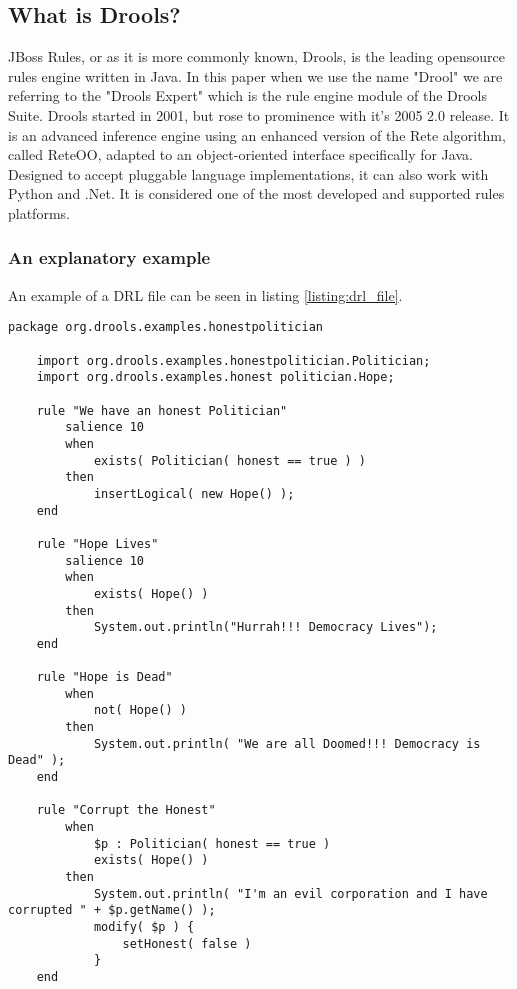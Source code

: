 \subsection{What is Drools?}

JBoss Rules, or as it is more commonly known, Drools, is the leading opensource rules engine written in Java.
In this paper when we use the name "Drool" we are referring to the "Drools Expert" which is the rule engine module of the Drools Suite.
Drools started in 2001, but rose to prominence with it's 2005 2.0 release.  
It is an advanced inference engine using an enhanced version of the Rete algorithm, called Rete\-OO\cite{sottara2010configurable}, adapted to an object-oriented interface specifically for Java.
Designed to accept pluggable language implementations, it can also work with Python and .Net.
It is considered one of the most developed and supported rules platforms.




\subsubsection{An explanatory example}
An example of a DRL file can be seen in listing \ref{listing:drl_file}. 

\begin{lstlisting}[language={[drl]Drools}, caption=Example Drools file., captionpos=b, label=listing:drl_file]
    package org.drools.examples.honestpolitician
 
    import org.drools.examples.honestpolitician.Politician;
    import org.drools.examples.honest politician.Hope;
     
    rule "We have an honest Politician"
        salience 10
        when
            exists( Politician( honest == true ) )
        then
            insertLogical( new Hope() );
    end
    
    rule "Hope Lives"
        salience 10
        when
            exists( Hope() )
        then
            System.out.println("Hurrah!!! Democracy Lives");
    end
    
    rule "Hope is Dead"
        when
            not( Hope() )
        then
            System.out.println( "We are all Doomed!!! Democracy is Dead" );
    end
    
    rule "Corrupt the Honest"
        when
            $p : Politician( honest == true )   
            exists( Hope() )
        then
            System.out.println( "I'm an evil corporation and I have corrupted " + $p.getName() );
            modify( $p ) { 
                setHonest( false ) 
            }
    end
\end{lstlisting}


